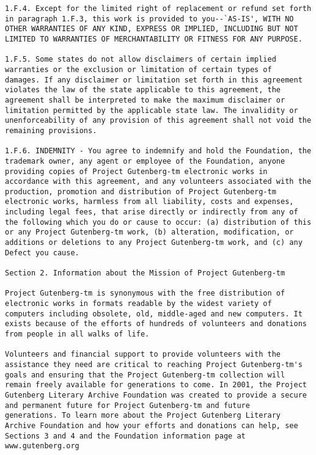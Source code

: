 \documentclass[oneside]{book}
\begin{document}
\begin{verbatim}
1.F.4. Except for the limited right of replacement or refund set forth
in paragraph 1.F.3, this work is provided to you--`AS-IS', WITH NO
OTHER WARRANTIES OF ANY KIND, EXPRESS OR IMPLIED, INCLUDING BUT NOT
LIMITED TO WARRANTIES OF MERCHANTABILITY OR FITNESS FOR ANY PURPOSE.

1.F.5. Some states do not allow disclaimers of certain implied
warranties or the exclusion or limitation of certain types of
damages. If any disclaimer or limitation set forth in this agreement
violates the law of the state applicable to this agreement, the
agreement shall be interpreted to make the maximum disclaimer or
limitation permitted by the applicable state law. The invalidity or
unenforceability of any provision of this agreement shall not void the
remaining provisions.

1.F.6. INDEMNITY - You agree to indemnify and hold the Foundation, the
trademark owner, any agent or employee of the Foundation, anyone
providing copies of Project Gutenberg-tm electronic works in
accordance with this agreement, and any volunteers associated with the
production, promotion and distribution of Project Gutenberg-tm
electronic works, harmless from all liability, costs and expenses,
including legal fees, that arise directly or indirectly from any of
the following which you do or cause to occur: (a) distribution of this
or any Project Gutenberg-tm work, (b) alteration, modification, or
additions or deletions to any Project Gutenberg-tm work, and (c) any
Defect you cause.

Section 2. Information about the Mission of Project Gutenberg-tm

Project Gutenberg-tm is synonymous with the free distribution of
electronic works in formats readable by the widest variety of
computers including obsolete, old, middle-aged and new computers. It
exists because of the efforts of hundreds of volunteers and donations
from people in all walks of life.

Volunteers and financial support to provide volunteers with the
assistance they need are critical to reaching Project Gutenberg-tm's
goals and ensuring that the Project Gutenberg-tm collection will
remain freely available for generations to come. In 2001, the Project
Gutenberg Literary Archive Foundation was created to provide a secure
and permanent future for Project Gutenberg-tm and future
generations. To learn more about the Project Gutenberg Literary
Archive Foundation and how your efforts and donations can help, see
Sections 3 and 4 and the Foundation information page at
www.gutenberg.org


\end{verbatim}
\end{document}
